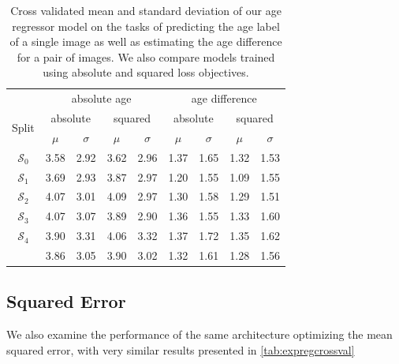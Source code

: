 \begin{table}[h]
	\begin{center}
		\begin{tabular}{c c c c c | c c c c}
			\toprule
			 & 
			\multicolumn{4}{c}{absolute age} & 
			\multicolumn{4}{c}{age difference} \\
			\cmidrule(lr){2-5}
			\cmidrule(lr){6-9}
			\multirow{2}{*}{Split} &
			\multicolumn{2}{c}{absolute} & 
			\multicolumn{2}{c}{squared} &
			\multicolumn{2}{c}{absolute} & 
			\multicolumn{2}{c}{squared} \\
			\cmidrule(lr){2-3}
			\cmidrule(lr){4-5}
			\cmidrule(lr){6-7}
			\cmidrule(lr){8-9}
			 & $\mu$ & $\sigma$ & $\mu$ & $\sigma$ & $\mu$ & $\sigma$ & $\mu$ & $\sigma$ \\ 
			\cmidrule(lr){1-9}
			$\mathcal{S}_0$ & 3.58 & 2.92 & 3.62 & 2.96 & 1.37 & 1.65 & 1.32 & 1.53 \\
			$\mathcal{S}_1$ & 3.69 & 2.93 & 3.87 & 2.97 & 1.20 & 1.55 & 1.09 & 1.55 \\
			$\mathcal{S}_2$ & 4.07 & 3.01 & 4.09 & 2.97 & 1.30 & 1.58 & 1.29 & 1.51 \\
			$\mathcal{S}_3$ & 4.07 & 3.07 & 3.89 & 2.90 & 1.36 & 1.55 & 1.33 & 1.60 \\
			$\mathcal{S}_4$ & 3.90 & 3.31 & 4.06 & 3.32 & 1.37 & 1.72 & 1.35 & 1.62 \\
			\cmidrule(lr){1-9}
					& 3.86 & 3.05 & 3.90 & 3.02 & 1.32 & 1.61 & 1.28 & 1.56 \\
			\bottomrule
		\end{tabular}
		\caption{Cross validated mean and standard deviation of our age regressor model on the tasks of predicting the age label of a single image as well as estimating the age difference for a pair of images. We also compare models trained using absolute and squared loss objectives.}
		\label{tab:expregcrossval}
	\end{center}
\end{table}

\subsection*{Squared Error}
We also examine the performance of the same architecture optimizing the mean squared error, with very similar results presented in \autoref{tab:expregcrossval}

